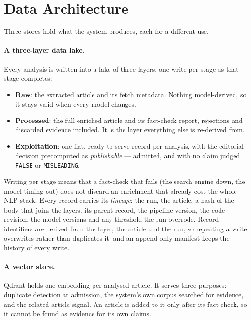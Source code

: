 
\section{Data Architecture}
\label{sec:data-architecture}

Three stores hold what the system produces, each for a different use.

\paragraph{A three-layer data lake.} Every analysis is written into a
lake of three layers, one write per stage as that stage completes:

\begin{itemize}
    \item \textbf{Raw}: the extracted article and its fetch metadata.
    Nothing model-derived, so it stays valid when every model changes.
    \item \textbf{Processed}: the full enriched article and its
    fact-check report, rejections and discarded evidence included. It
    is the layer everything else is re-derived from.
    \item \textbf{Exploitation}: one flat, ready-to-serve record per
    analysis, with the editorial decision precomputed as
    \emph{publishable} --- admitted, and with no claim judged
    \texttt{FALSE} or \texttt{MISLEADING}.
\end{itemize}

Writing per stage means that a fact-check that fails (the search
engine down, the model timing out) does not discard an enrichment that
already cost the whole NLP stack. Every record carries its
\emph{lineage}: the run, the article, a hash of the body that joins the
layers, its parent record, the pipeline version, the code revision, the
model versions and any threshold the run overrode. Record identifiers
are derived from the layer, the article and the run, so repeating a
write overwrites rather than duplicates it, and an append-only manifest
keeps the history of every write.

\paragraph{A vector store.} Qdrant holds one embedding per analysed
article. It serves three purposes: duplicate detection at admission,
the system's own corpus searched for evidence, and the related-article
signal. An article is added to it only after its fact-check, so it
cannot be found as evidence for its own claims.

